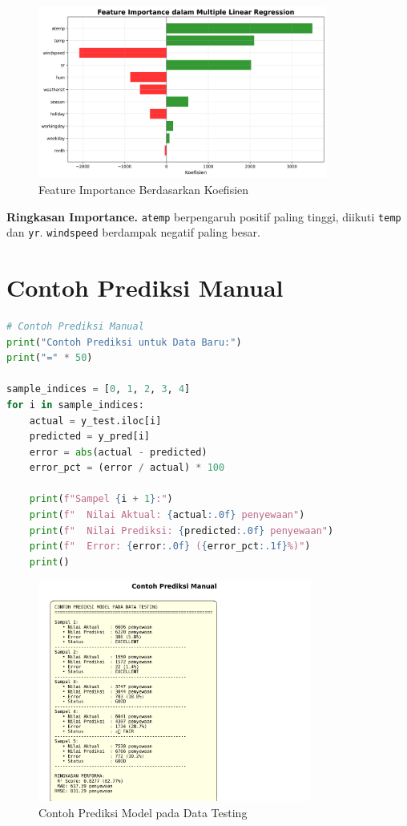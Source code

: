 \documentclass[11pt,a4paper]{article}
\begin{document}
\begin{figure}[h]
    \centering
    \includegraphics[width=0.85\textwidth]{./OUTPUT/step9_feature_importance.png}
    \caption{Feature Importance Berdasarkan Koefisien}
    \label{fig:feature_importance}
\end{figure}

\noindent\textbf{Ringkasan Importance.}
\texttt{atemp} berpengaruh positif paling tinggi, diikuti \texttt{temp} dan \texttt{yr}. \texttt{windspeed} berdampak negatif paling besar.

\section{Contoh Prediksi Manual}
\begin{lstlisting}[language=Python]
# Contoh Prediksi Manual
print("Contoh Prediksi untuk Data Baru:")
print("=" * 50)

sample_indices = [0, 1, 2, 3, 4]
for i in sample_indices:
    actual = y_test.iloc[i]
    predicted = y_pred[i]
    error = abs(actual - predicted)
    error_pct = (error / actual) * 100

    print(f"Sampel {i + 1}:")
    print(f"  Nilai Aktual: {actual:.0f} penyewaan")
    print(f"  Nilai Prediksi: {predicted:.0f} penyewaan")
    print(f"  Error: {error:.0f} ({error_pct:.1f}%)")
    print()
\end{lstlisting}

\begin{figure}[h]
    \centering
    \includegraphics[width=0.8\textwidth]{./OUTPUT/step10_prediction_examples.png}
    \caption{Contoh Prediksi Model pada Data Testing}
    \label{fig:prediction_examples}
\end{figure}
\end{document}
